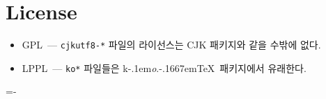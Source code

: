 \documentclass[dvipdfmx,b5paper]{article}
\def\koTeX{\textsf{k}\kern-.1em\textit{o}.\kern-.1667em\TeX}
\begin{document}
\section{License}
\begin{itemize}
  \item GPL~--- \verb|cjkutf8-*| 파일의 라이선스는 CJK 패키지와
    같을 수밖에 없다.
  \item LPPL~--- \verb|ko*| 파일들은 \koTeX\ 패키지에서 유래한다.
\end{itemize}
\nobreak\hfill \fboxsep=-\fboxrule {}
\end{document}
